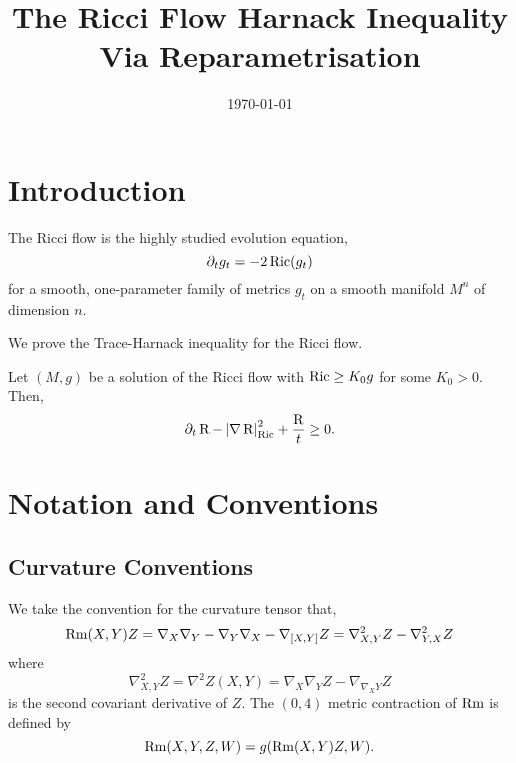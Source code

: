 \documentclass{amsart}
\begin{document}
\title[Harnack For Ricci Flow]
 {The Ricci Flow Harnack Inequality Via Reparametrisation}

\curraddr{}
\email{}
\date{\today}

\dedicatory{}
\subjclass[2010]{}
\keywords{}

\begin{abstract}
\end{abstract}

\maketitle

\section{Introduction}
\label{sec:intro}

The Ricci flow is the highly studied evolution equation,
\[
\partial_t g_t = - 2\operatorname{Ric} (g_t)
\]
for a smooth, one-parameter family of metrics \(g_t\) on a smooth manifold \(M^n\) of dimension \(n\).

We prove the Trace-Harnack inequality for the Ricci flow.

\begin{thm}
\label{thm:harnack}
Let \((M, g)\) be a solution of the Ricci flow with \(\operatorname{Ric} \geq K_0 g\) for some \(K_0 > 0\). Then,
\[
\partial_t \operatorname{R} - \left|{\nabla \operatorname{R}}\right|_{\operatorname{Ric}}^2 + \frac{\operatorname{R}}{t} \geq 0.
\]
\end{thm}

\section{Notation and Conventions}
\label{sec:conventions}

\subsection{Curvature Conventions}
\label{subsec:conventions_curvature}

We take the convention for the curvature tensor that,
\[
\operatorname{Rm}(X, Y) Z = \nabla_X \nabla_Y - \nabla_ Y \nabla_X - \nabla_{[X, Y]} Z = \nabla^2_{X, Y} Z - \nabla^2_{Y, X} Z
\]
where
\[
\nabla^2_{X, Y} Z = \nabla^2 Z (X, Y) = \nabla_X \nabla_Y Z - \nabla_{\nabla_X Y} Z
\]
is the second covariant derivative of \(Z\). The \((0, 4)\) metric contraction of \(\operatorname{Rm}\) is defined by
\[
\operatorname{Rm}(X, Y, Z, W) = g(\operatorname{Rm}(X, Y)Z, W).
\]
\end{document}
